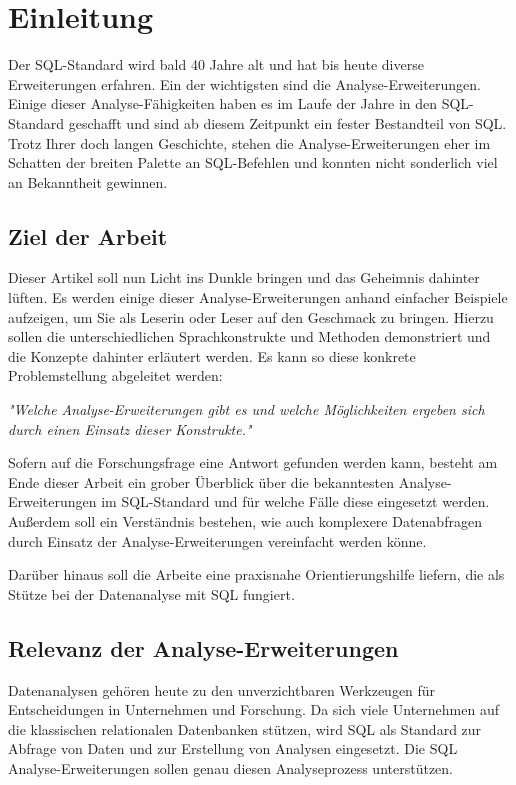 \chapter{Einleitung}
Der SQL-Standard wird bald 40 Jahre alt und hat bis heute diverse Erweiterungen erfahren.
Ein der wichtigsten sind die Analyse-Erweiterungen. Einige dieser Analyse-Fähigkeiten
haben es im Laufe der Jahre in den SQL-Standard geschafft und sind ab diesem Zeitpunkt
ein fester Bestandteil von SQL. Trotz Ihrer doch langen Geschichte, stehen die Analyse-Erweiterungen
eher im Schatten der breiten Palette an SQL-Befehlen und konnten nicht sonderlich
viel an Bekanntheit gewinnen.

\section{Ziel der Arbeit}
Dieser Artikel soll nun Licht ins Dunkle bringen und das Geheimnis dahinter lüften.
Es werden einige dieser Analyse-Erweiterungen anhand einfacher Beispiele
aufzeigen, um Sie als Leserin oder Leser auf den Geschmack zu bringen. Hierzu
sollen die unterschiedlichen Sprachkonstrukte und Methoden demonstriert und die
Konzepte dahinter erläutert werden. Es kann so diese konkrete Problemstellung abgeleitet
werden:

\begin{center}
	\textit{"Welche Analyse-Erweiterungen gibt es und welche Möglichkeiten ergeben
	sich durch einen Einsatz dieser Konstrukte."}
\end{center}

Sofern auf die Forschungsfrage eine Antwort gefunden werden kann, besteht am Ende
dieser Arbeit ein grober Überblick über die bekanntesten Analyse-Erweiterungen im
SQL-Standard und für welche Fälle diese eingesetzt werden. Außerdem soll ein
Verständnis bestehen, wie auch komplexere Datenabfragen durch Einsatz der Analyse-Erweiterungen
vereinfacht werden könne.

Darüber hinaus soll die Arbeite eine praxisnahe Orientierungshilfe liefern, die
als Stütze bei der Datenanalyse mit SQL fungiert.

\section{Relevanz der Analyse-Erweiterungen}
Datenanalysen gehören heute zu den unverzichtbaren Werkzeugen für Entscheidungen
in Unternehmen und Forschung. Da sich viele Unternehmen auf die klassischen relationalen
Datenbanken stützen, wird SQL als Standard zur Abfrage von Daten und zur
Erstellung von Analysen eingesetzt. Die SQL Analyse-Erweiterungen sollen genau diesen
Analyseprozess unterstützen.

